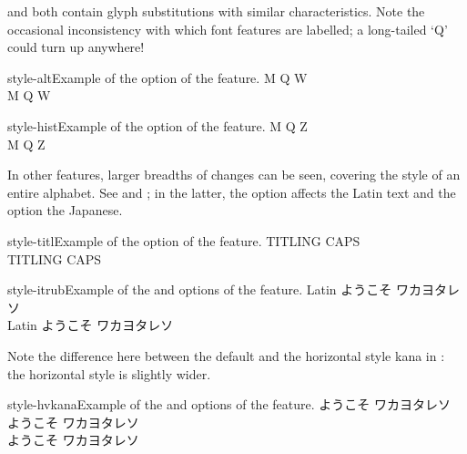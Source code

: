  and  both contain glyph
substitutions with similar characteristics.
Note the occasional inconsistency with which font features are labelled; a long-tailed `Q' could turn up anywhere!

 \begin{Xexample}[firstline=2]{style-alt}{Example of the  option of the  feature.}
  \Large
   M Q W                      \\
   M Q W
\end{Xexample}

\begin{Xexample}[firstline=2]{style-hist}{Example of the  option of the  feature.}
  \Large
   M Q Z                      \\
   M Q Z
\end{Xexample}

In other features, larger breadths of changes can be seen, covering
the style of an entire alphabet. See  and ; in the latter, the  option affects the Latin text and the  option the Japanese.

\begin{Xexample}[firstline=2]{style-titl}{Example of the  option of the  feature.}
  \Large
   TITLING CAPS                       \\
   TITLING CAPS
\end{Xexample}

\begin{Xexample}[firstline=2]{style-itrub}{Example of the  and  options of the  feature.}
  \Large \def\kana{ようこそ ワカヨタレソ}
   Latin \kana        \\
   Latin \kana
\end{Xexample}

Note the difference here between the default and the horizontal style kana
in : the horizontal style is slightly wider.

\begin{Xexample}[firstline=2]{style-hvkana}{Example of the  and  options of the  feature.}
  \Large \def\kana{ようこそ ワカヨタレソ}
    \kana   \\
  {
    \kana } \\
  {
    \kana }
\end{Xexample}

